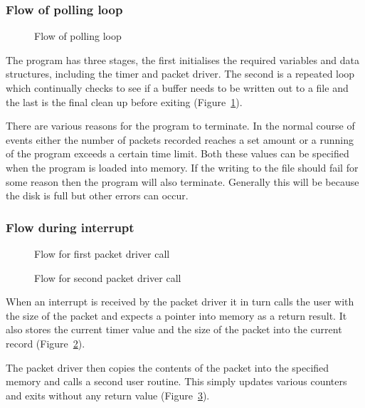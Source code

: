 \subsubsection{Flow of polling loop}

\begin{figure}
\leavevmode
{}
\caption{Flow of polling loop}
\label{trace:flow}
\end{figure}

The program has three stages, the first initialises the required
variables and data structures, including the timer and packet driver.
The second is a repeated loop which continually checks to see if a
buffer needs to be written out to a file and the last is the final
clean up before exiting (Figure~\ref{trace:flow}).

There are various reasons for the program to terminate.  In the normal
course of events either the number of packets recorded reaches a set
amount or a running of the program exceeds a certain time limit.  Both
these values can be specified when the program is loaded into memory.
If the writing to the file should fail for some reason then the
program will also terminate.  Generally this will be because the disk
is full but other errors can occur.

\subsubsection{Flow during interrupt}

\begin{figure}
\leavevmode
{}
\caption{Flow for first packet driver call}
\label{trace:rcvpkt1}
\end{figure}

\begin{figure}
\leavevmode
{}
\caption{Flow for second packet driver call}
\label{trace:rcvpkt2}
\end{figure}

When an interrupt is received by the packet driver it in turn calls
the user with the size of the packet and expects a pointer into memory
as a return result.  It also stores the current timer value and the
size of the packet into the current record
(Figure~\ref{trace:rcvpkt1}).

The packet driver then copies the contents of the packet into the
specified memory and calls a second user routine.  This simply updates
various counters and exits without any return value
(Figure~\ref{trace:rcvpkt2}).

